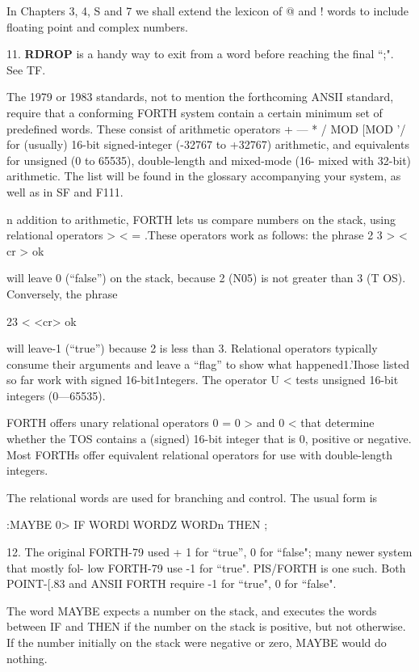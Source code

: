 \begin{itemize}
In Chapters 3, 4, S and 7 we shall extend the lexicon of @ and ! words to include floating point and complex numbers.

11. \textbf{RDROP} is a handy way to exit from a word before reaching the ﬁnal “;". See TF.


The 1979 or 1983 standards, not to mention the forthcoming ANSII standard, require that a conforming FORTH system contain a certain minimum set of predefined words. These consist of arithmetic operators + — * / MOD [MOD '/ for (usually) 16-bit signed-integer (-32767 to +32767) arithmetic, and equivalents for unsigned (0 to 65535), double-length and mixed-mode (16- mixed with 32-bit) arithmetic. The list will be found in the glossary accompanying your system, as well as in SF and F111.


n addition to arithmetic, FORTH lets us compare numbers on the stack, using relational operators > < = .These operators work as follows: the phrase
2 3 > < cr > ok

will leave 0 (“false”) on the stack, because 2 (N05) is not greater
than 3 (T OS). Conversely, the phrase

23 < <cr> ok

will leave-1 (“true”) because 2 is less than 3. Relational operators typically consume their arguments and leave a “ﬂag” to show what happened1.'Ihose listed so far work with signed 16-bit1ntegers. The operator U < tests unsigned 16-bit integers (0—65535).

FORTH offers unary relational operators 0 = 0 > and 0 < that determine whether the TOS contains a (signed) 16-bit integer that is 0, positive or negative. Most FORTHs offer equivalent relational operators for use with double-length integers.

The relational words are used for branching and control. The usual form is

:MAYBE 0> IF WORDl WORDZ
WORDn THEN ;

12. The original FORTH-79 used + 1 for “true”, 0 for “false"; many newer system that mostly fol-
low FORTH-79 use -1 for “true". PIS/FORTH is one such. Both POINT-[.83 and ANSII
FORTH require -1 for “true", 0 for “false".

The word MAYBE expects a number on the stack, and executes the words between IF and THEN if the number on the stack is positive, but not otherwise. If the number initially on the stack were negative or zero, MAYBE would do nothing.


\end{itemize}
